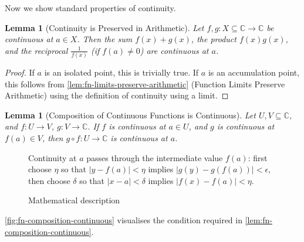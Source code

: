 \documentclass[11pt]{article}
\numberwithin{equation}{section}
\newtheorem{lemma}[theorem]{Lemma}
\theoremstyle{definition}
\theoremstyle{remark}
\newcommand{\pqty}[1]{\left(#1\right)}
\newcommand{\functiondomain}[3]{#1:#2\to #3}
\newcommand{\CC}{\mathbb C}
\begin{document}
Now we show standard properties of continuity.

\begin{lemma}[Continuity is Preserved in Arithmetic]\label{analysis-unit-0084}
    \label{lem:fn-continuity-arithmetic}%
    Let \(\functiondomain{f, g}{X \subseteq \CC}{\CC}\) be continuous at \(a \in X\). Then the sum \(f\pqty{x} + g\pqty{x}\), the product \(f\pqty{x}g\pqty{x}\), and the reciprocal \(\frac{1}{f\pqty{x}}\) (if \(f\pqty{a} \neq 0\)) are continuous at \(a\).
\end{lemma}

\begin{proof}
    If \(a\) is an isolated point, this is trivially true. If \(a\) is an accumulation point, this follows from \autoref{lem:fn-limits-preserve-arithmetic} (Function Limits Preserve Arithmetic) using the definition of continuity using a limit.
\end{proof}

\begin{lemma}[Composition of Continuous Functions is Continuous]\label{analysis-unit-0085}
    \label{lem:fn-composition-continuous}%
    Let \(U, V \subseteq \CC\), and \(\functiondomain{f}{U}{V}\), \(\functiondomain{g}{V}{\CC}\). If \(f\) is continuous at \(a \in U\), and \(g\) is continuous at \(f\pqty{a} \in V\), then \(\functiondomain{g \circ f}{U}{\CC}\) is continuous at \(a\).
\end{lemma}

\begin{figure}[ht!]\centering\begin{minipage}{.94\linewidth}Continuity at \(a\) passes through the intermediate value \(f(a)\): first choose \(\eta\) so that \(|y-f(a)|<\eta\) implies \(|g(y)-g(f(a))|<\epsilon\), then choose \(\delta\) so that \(|x-a|<\delta\) implies \(|f(x)-f(a)|<\eta\).\end{minipage}\caption{Mathematical description}\label{fig:fn-composition-continuous}\end{figure}

\autoref{fig:fn-composition-continuous} visualises the condition required in \autoref{lem:fn-composition-continuous}.
\end{document}
